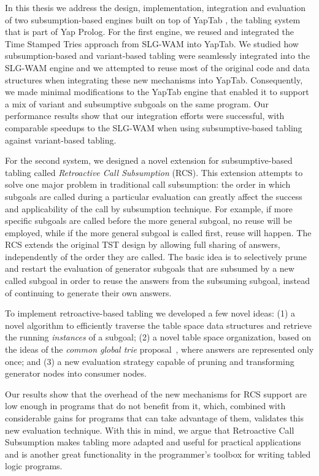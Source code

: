 In this thesis we address the design, implementation, integration and evaluation of two subsumption-based engines
built on top of YapTab \cite{Rocha-00a}, the tabling system that is part of Yap Prolog. For the first engine, we
reused and integrated the Time Stamped Tries approach from SLG-WAM into YapTab.
We studied how subsumption-based and variant-based tabling were seamlessly
integrated into the SLG-WAM engine and we attempted to reuse most of the original code and data structures when
integrating these new mechanisms into YapTab.  Consequently, we made minimal modifications to the YapTab engine
that enabled it to support a mix of variant and subsumptive subgoals on the same program.
Our performance results show that our integration efforts were successful, with comparable
speedups to the SLG-WAM when using subsumptive-based tabling against variant-based tabling.

For the second system, we designed a novel extension for subsumptive-based tabling called
\emph{Retroactive Call Subsumption} (RCS).
This extension attempts to solve one major problem in traditional call subsumption: the order in
which subgoals are called during a particular evaluation can greatly affect the success and applicability
of the call by subsumption technique. For example, if more specific subgoals are called before
the more general subgoal, no reuse will be employed, while if the more general subgoal is called first,
reuse will happen. The RCS extends the original TST design by allowing full sharing of answers, independently
of the order they are called. The basic idea is to selectively prune and restart the evaluation of generator
subgoals that are subsumed by a new called subgoal in order to reuse the answers from the subsuming subgoal,
instead of continuing to generate their own answers.

To implement retroactive-based tabling we developed a few novel ideas: (1) a novel algorithm to efficiently
traverse the table space data structures and retrieve the running \emph{instances} of a subgoal; (2) a novel table
space organization, based on the ideas of the \emph{common global trie} proposal~\cite{CostaJ-08}, where answers
are represented only once; and (3) a new evaluation strategy capable of pruning and transforming generator nodes
into consumer nodes.

Our results show that the overhead of the new mechanisms for RCS support are low enough in programs that do not
benefit from it, which, combined with considerable gains for programs that can take advantage of them, validates
this new evaluation technique. With this in mind, we argue that Retroactive Call Subsumption makes tabling
more adapted and useful for practical applications and is another great functionality in the programmer's toolbox for
writing tabled logic programs.

